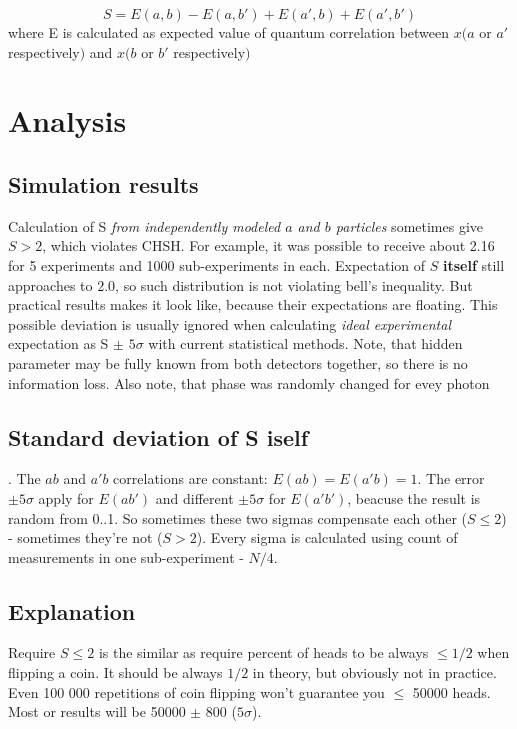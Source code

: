 \documentclass[a4paper]{article}
\begin{document}
\begin{equation}
S = E(a, b) - E(a, b') + E(a', b) + E(a', b')
\end{equation}
where E is calculated as expected value of quantum correlation between $x (a$ or $a'$ respectively$)$ and $x(b$ or $b'$ respectively$)$


\section{Analysis}
\subsection{Simulation results}

Calculation of S \textit{from independently modeled $a$ and $b$ particles} sometimes give $S > 2$, which violates CHSH. For example, it was possible to receive about 2.16 for 5 experiments and 1000 sub-experiments in each. Expectation of $S$ \textbf{itself}  still approaches to $2.0$, so such distribution is not violating bell's inequality. But practical results makes it look like, because their expectations are floating. This possible deviation is usually ignored when calculating \textit{ideal experimental} expectation as S $\pm$ $5\sigma$ with current statistical methods. Note, that hidden parameter may be fully known from both detectors together, so there is no information loss. Also note, that phase was randomly changed for evey photon




\subsection {Standard deviation of S iself}. The $ab$ and $a'b$ correlations are constant: $E(ab)=E(a'b)=1$. The error $\pm5\sigma$ apply for $E(ab')$ and different $\pm5\sigma$ for $E(a'b')$, beacuse the result is random from 0..1. So sometimes these two sigmas compensate each other ($S \le 2$) - sometimes they're not ($S > 2$). Every sigma is calculated using count of measurements in one sub-experiment - $N/4$.




\subsection {Explanation}

Require $S \le 2$ is the similar as require percent of heads to be always $\le 1/2 $ when flipping a coin. It should be always $1/2$ in theory, but obviously not in practice. Even 100 000 repetitions of coin flipping won't guarantee you $\le$ 50000 heads. Most or results will be 50000 $\pm$ 800 ($5\sigma$). 
\end{document}
